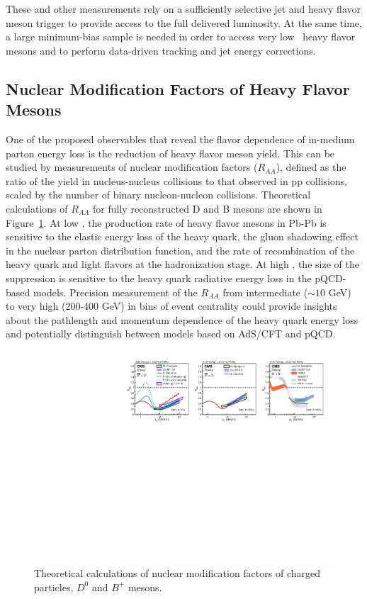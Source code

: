 These and other measurements rely on a sufficiently selective jet and heavy flavor meson trigger to provide access to the full delivered luminosity. At the same time, a large minimum-bias sample is needed in order to access very low \pt\ heavy flavor mesons and to perform data-driven tracking and jet energy corrections. 


\subsection{Nuclear Modification Factors of Heavy Flavor Mesons}

One of the proposed observables that reveal the flavor dependence of in-medium parton energy loss is the reduction of heavy flavor meson yield. This can be studied by measurements of nuclear modification factors ($R_{AA}$), defined as the ratio of the yield in nucleus-nucleus collisions to that observed in pp collisions, scaled by the number of binary nucleon-nucleon collisions. Theoretical calculations of $R_{AA}$ for fully reconstructed D and B mesons are shown in Figure~\ref{fig:RAA_theory}. At low \pt, the production rate of heavy flavor mesons in Pb-Pb is sensitive to the elastic energy loss of the heavy quark, the gluon shadowing effect in the nuclear parton distribution function, and the rate of recombination of the heavy quark and light flavors at the hadronization stage. At high \pt, the size of the suppression is sensitive to the heavy quark radiative energy loss in the pQCD-based models. Precision measurement of the $R_{AA}$ from intermediate \pt ($\sim 10$ GeV) to very high \pt (200-400 GeV) in bins of event centrality could provide insights about the pathlength and momentum dependence of the heavy quark energy loss and potentially distinguish between models based on AdS/CFT and pQCD. 

\begin{figure}[!ht]
\begin{center}
\includegraphics[width=.98\textwidth]{figures/cTheoryRAA_BD_v1.pdf}
\caption{Theoretical calculations of nuclear modification factors of charged particles, $D^0$ and $B^+$ mesons.}
\label{fig:RAA_theory}
\end{center}
\end{figure}

